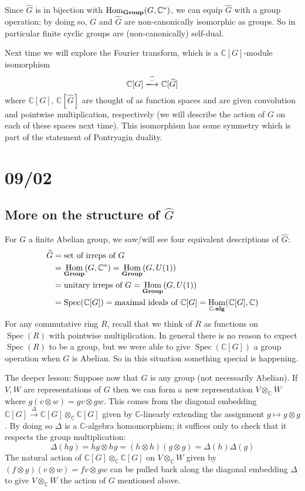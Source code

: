 \documentclass[11pt,leqno]{article}
\theoremstyle{plain}
\theoremstyle{definition}
\numberwithin{equation}{section}
\numberwithin{lem}{section}
\DeclareMathOperator{\Hom}{Hom}
\DeclareMathOperator{\Spec}{Spec}
\newcommand{\catname}[1]{{\normalfont\mathbf{#1}}}
\newcommand{\alg}{\text{-}\catname{alg}}
\newcommand{\Group}{\catname{Group}}
\begin{document}
Since $\widehat G$ is in bijection with $\Hom_{\Group}(G,\mathbb C^\ast)$, we can equip $\widehat G$ with a group operation; by doing so, $G$ and $\widehat G$ are non-canonically isomorphic as groups. So in particular finite cyclic groups are (non-canonically) self-dual.

Next time we will explore the Fourier transform, which is a $\mathbb C[G]$-module isomorphism
\[\mathbb C[G]\xlongrightarrow{\widehat{-}}\mathbb C[\widehat G]\]
where $\mathbb C[G]$, $\mathbb C[\widehat G]$ are thought of as function spaces and are given convolution and pointwise multiplication, respectively (we will describe the action of $G$ on each of these spaces next time). This isomorphism has some symmetry which is part of the statement of Pontryagin duality.

\newpage\section{09/02}
\subsection{More on the structure of $\widehat G$}
For $G$ a finite Abelian group, we saw/will see four equivalent descriptions of $\widehat G$:
\begin{align*}
	\widehat G &= \text{set of irreps of $G$}\\
	&= \Hom_{\Group}(G,\mathbb C^\ast) = \Hom_{\Group}(G,U(1))\\
	&= \text{unitary irreps of $G$} = \Hom_{\Group}(G,U(1))\\
	&= \Spec(\mathbb C[G]) = \text{maximal ideals of $\mathbb C[G]$} = \Hom_{\mathbb C\alg}(\mathbb C[G],\mathbb C)
\end{align*}
For any commutative ring $R$, recall that we think of $R$ as functions on $\Spec(R)$ with pointwise multiplication. In general there is no reason to expect $\Spec(R)$ to be a group, but we were able to give $\Spec(\mathbb C[G])$ a group operation when $G$ is Abelian. So in this situation something special is happening. 

The deeper lesson: Suppose now that $G$ is any group (not necessarily Abelian). If $V,W$ are representations of $G$ then we can form a new representation $V\otimes_{\mathbb C}W$ where $g(v\otimes w) = gv\otimes gw$. This comes from the diagonal embedding $\mathbb C[G]\xrightarrow{\Delta}\mathbb C[G]\otimes_{\mathbb C} \mathbb C[G]$ given by $\mathbb C$-linearly extending the assignment $g\mapsto g\otimes g$. By doing so $\Delta$ is a $\mathbb C$-algebra homomorphism; it suffices only to check that it respects the group multiplication:
\[\Delta(hg) = hg\otimes hg = (h\otimes h)(g\otimes g) = \Delta(h)\Delta(g)\]
The natural action of $\mathbb C[G]\otimes_{\mathbb C} \mathbb C[G]$ on $V\otimes_{\mathbb C} W$ given by $(f\otimes g)(v\otimes w) = fv\otimes gw$ can be pulled back along the diagonal embedding $\Delta$ to give $V\otimes_{\mathbb C} W$ the action of $G$ mentioned above.
\end{document}
